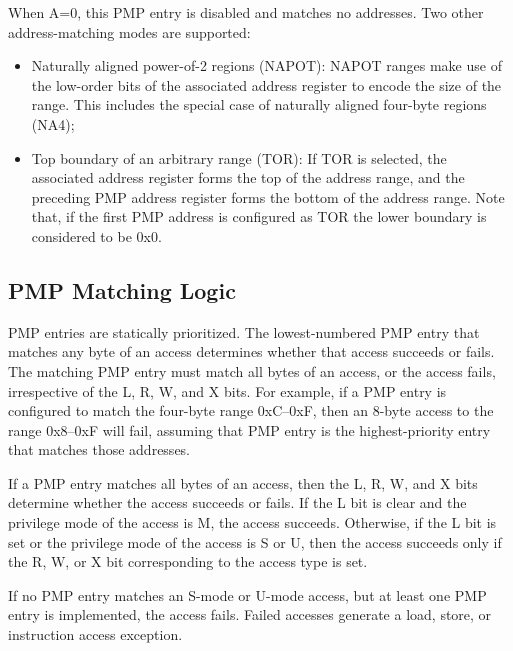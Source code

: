 When A=0, this PMP entry is disabled and matches no addresses. Two other address-matching
modes are supported:
\begin{itemize}
  \item Naturally aligned power-of-2 regions (NAPOT): NAPOT ranges make use of
    the low-order bits of the associated address register to encode the size of
    the range. This includes the special case of naturally aligned four-byte regions
    (NA4);

  \item Top boundary of an arbitrary range (TOR): If TOR is selected, the associated
    address register forms the top of the address range, and the preceding PMP
    address register forms the bottom of the address range. Note that, if the
    first PMP address is configured as TOR the lower boundary is considered to
    be 0x0.
\end{itemize}

\subsection{PMP Matching Logic}
\label{subsec:matchinglogic}

PMP entries are statically prioritized. The lowest-numbered PMP entry that matches
any byte of an access determines whether that access succeeds or fails. The
matching PMP entry must match all bytes of an access, or the access fails,
irrespective of the L, R, W, and X bits. For example, if a PMP entry is configured
to match the four-byte range 0xC–0xF, then an 8-byte access to the range 0x8–0xF
will fail, assuming that PMP entry is the highest-priority entry that matches those
addresses.

If a PMP entry matches all bytes of an access, then the L, R, W, and X bits determine
whether the access succeeds or fails. If the L bit is clear and the privilege
mode of the access is M, the access succeeds. Otherwise, if the L bit is set or the
privilege mode of the access is S or U, then the access succeeds only if the R, W,
or X bit corresponding to the access type is set.

If no PMP entry matches an S-mode or U-mode access, but at least one PMP entry is
implemented, the access fails. Failed accesses generate a load, store, or instruction
access exception.